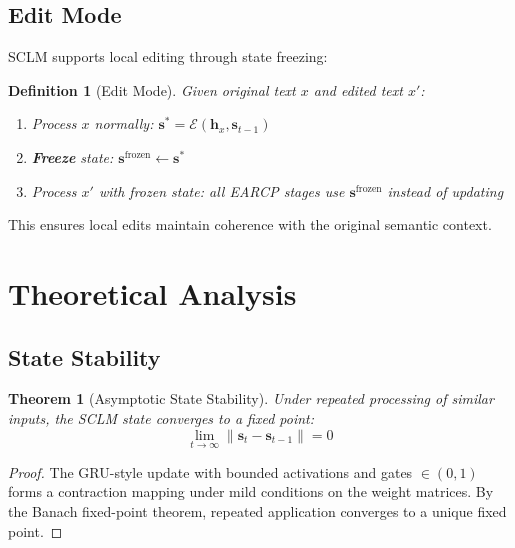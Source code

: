 \documentclass[11pt,a4paper]{article}
\newtheorem{definition}{Definition}
\newtheorem{theorem}{Theorem}
\newcommand{\state}{\mathbf{s}}
\newcommand{\hidden}{\mathbf{h}}
\newcommand{\encaps}{\mathcal{E}}
\begin{document}
\subsection{Edit Mode}

SCLM supports local editing through state freezing:

\begin{definition}[Edit Mode]
Given original text $x$ and edited text $x'$:
\begin{enumerate}
    \item Process $x$ normally: $\state^* = \encaps(\hidden_x, \state_{t-1})$
    \item \textbf{Freeze} state: $\state^{\text{frozen}} \leftarrow \state^*$
    \item Process $x'$ with frozen state: all EARCP stages use $\state^{\text{frozen}}$ instead of updating
\end{enumerate}
\end{definition}

This ensures local edits maintain coherence with the original semantic context.

\section{Theoretical Analysis}

\subsection{State Stability}

\begin{theorem}[Asymptotic State Stability]
\label{thm:stability}
Under repeated processing of similar inputs, the SCLM state converges to a fixed point:
\begin{equation}
\lim_{t \to \infty} \|\state_t - \state_{t-1}\| = 0
\end{equation}
\end{theorem}

\begin{proof}
The GRU-style update with bounded activations and gates $\in (0,1)$ forms a contraction mapping under mild conditions on the weight matrices. By the Banach fixed-point theorem, repeated application converges to a unique fixed point.
\end{proof}
\end{document}
